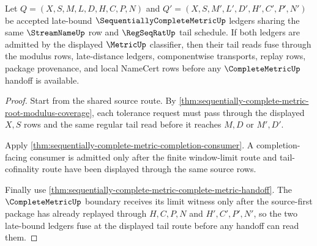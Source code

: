 \begin{theorem}
\label{thm:sequentially-complete-metric-tail-fusion}
Let $Q=(X,S,M,L,D,H,C,P,N)$ and $Q'=(X,S,M',L',D',H',C',P',N')$ be accepted late-bound $\SequentiallyCompleteMetricUp$ ledgers sharing the same $\StreamNameUp$ row and $\RegSeqRatUp$ tail schedule. If both ledgers are admitted by the displayed $\MetricUp$ classifier, then their tail reads fuse through the modulus rows, late-distance ledgers, componentwise transports, replay rows, package provenance, and local NameCert rows before any $\CompleteMetricUp$ handoff is available.
\end{theorem}
\begin{proof}
Start from the shared source route. By \autoref{thm:sequentially-complete-metric-root-modulus-coverage}, each tolerance request must pass through the displayed $X,S$ rows and the same regular tail read before it reaches $M,D$ or $M',D'$.

Apply \autoref{thm:sequentially-complete-metric-completion-consumer}. A completion-facing consumer is admitted only after the finite window-limit route and tail-cofinality route have been displayed through the same source rows.

Finally use \autoref{thm:sequentially-complete-metric-complete-metric-handoff}. The $\CompleteMetricUp$ boundary receives its limit witness only after the source-first package has already replayed through $H,C,P,N$ and $H',C',P',N'$, so the two late-bound ledgers fuse at the displayed tail route before any handoff can read them.
\end{proof}

